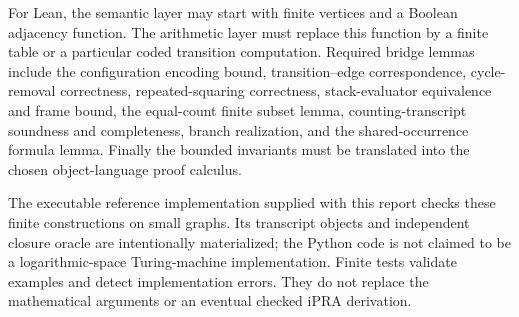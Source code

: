 For Lean, the semantic layer may start with finite vertices and a Boolean
adjacency function. The arithmetic layer must replace this function by a
finite table or a particular coded transition computation. Required bridge
lemmas include the configuration encoding bound, transition--edge
correspondence, cycle-removal correctness, repeated-squaring correctness,
stack-evaluator equivalence and frame bound, the equal-count finite subset
lemma, counting-transcript soundness and completeness, branch realization,
and the shared-occurrence formula lemma. Finally the bounded invariants
must be translated into the chosen object-language proof calculus.

The executable reference implementation supplied with this report checks
these finite constructions on small graphs. Its transcript objects and
independent closure oracle are intentionally materialized; the Python code
is not claimed to be a logarithmic-space Turing-machine implementation.
Finite tests validate examples and detect implementation errors. They do
not replace the mathematical arguments or an eventual checked iPRA
derivation.
